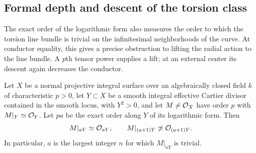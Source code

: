 \subsection{Formal depth and descent of the torsion class}
\label{subsec:conductor-picard-descent}

The exact order of the logarithmic form also measures the order to
which the torsion line bundle is trivial on the infinitesimal
neighborhoods of the curve. At conductor equality, this gives a
precise obstruction to lifting the radial action to the line bundle.
A $p$th tensor power supplies a lift; at an external center
its descent again decreases the conductor.

\begin{proposition}\label{prop:torsion-formal-depth}
Let $X$ be a normal projective integral surface over an algebraically
closed field $k$ of characteristic $p>0$, let $Y\subset X$ be a
smooth integral effective Cartier divisor contained in the smooth
locus, with $Y^2>0$, and let $M\ne\mathcal O_X$ have order $p$
with $M|_Y\simeq\mathcal O_Y$.
Let $pa$ be the exact order along $Y$ of its logarithmic form.
Then
\[
 M|_{aY}\simeq\mathcal O_{aY},
 \qquad M|_{(a+1)Y}\not\simeq\mathcal O_{(a+1)Y}.
\]
In particular, $a$ is the largest integer $n$ for which $M|_{nY}$
is trivial.
\end{proposition}

